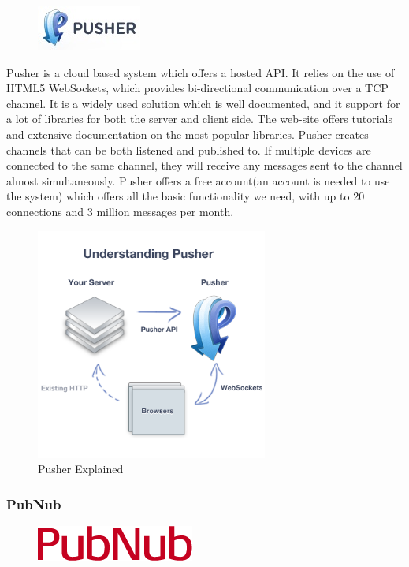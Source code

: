 \begin{figure}
\centering
\includegraphics[width=.19\textwidth]{image/pusher-logo.jpg}
\end{figure}

Pusher is a cloud based system which offers a hosted API. It relies on the use of HTML5 WebSockets, which provides bi-directional communication over a TCP channel. It is a widely used solution which is well documented, and it support for a lot of libraries for both the server and client side. The web-site offers tutorials and extensive documentation on the most popular libraries. Pusher creates channels that can be both listened and published to. If multiple devices are connected to the same channel, they will receive any messages sent to the channel almost simultaneously. Pusher offers a free account(an account is needed to use the system) which offers all the basic functionality we need, with up to 20 connections and 3 million messages per month.
\begin{figure}
\centering
\includegraphics[width=3in]{image/pusher-explained.png}
\caption{Pusher Explained}
\end{figure}

\subsubsection{PubNub}

\begin{figure}
\centering
\includegraphics[width=.19\textwidth]{image/pubnub-logo.png}
\end{figure}

